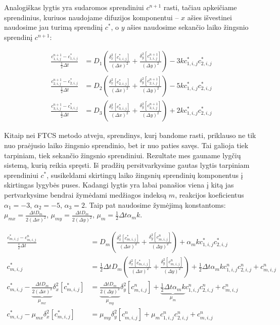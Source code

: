 Analogiškas lygtis yra sudaromos sprendiniui $c^{n+1}$ rasti, tačiau apkeičiame sprendinius, kuriuos naudojame difuzijos komponentui -- $x$ ašies išvestinei naudosime jau turimą sprendinį $c^{*}$, o $y$ ašies naudosime sekančio laiko žingsnio sprendinį $c^{n+1}$:

\begin{subequations} \label{eqs:adi-next-step}
\begin{align}
	\frac{c^{n+1}_{1,i,j} - c^*_{1,i,j}}{\frac{1}{2}\Delta t} 
	&= D_1 \left( \frac{\delta_x^2[c^{*}_{1,i,j}]}{(\Delta x)^2} 
	+ \frac{\delta_y^2[c^{n+1}_{1,i,j}]}{(\Delta y)^2} \right) - 3kc^*_{1,i,j}c^*_{2,i,j}\\
	\frac{c^{n+1}_{2,i,j} - c^*_{2,i,j}}{\frac{1}{2}\Delta t} 
	&= D_2 \left( \frac{\delta_x^2[c^*_{2,i,j}]}{(\Delta x)^2}
	+ \frac{\delta_y^2[c^{n+1}_{2,i,j}]}{(\Delta y)^2} \right) - 5kc^*_{1,i,j}c^*_{2,i,j}\\
	\frac{c^{n+1}_{3,i,j} - c^*_{3,i,j}}{\frac{1}{2}\Delta t} 
	&= D_3 \left( \frac{\delta_x^2[c^*_{3,i,j}]}{(\Delta x)^2} 
	+ \frac{\delta_y^2[c^{n+1}_{3,i,j}]}{(\Delta y)^2} \right) +2kc^*_{1,i,j}c^*_{2,i,j}
\end{align}
\end{subequations}

\newpage

Kitaip nei FTCS metodo atveju, sprendinys, kurį bandome rasti, priklauso ne tik nuo praėjusio laiko žingsnio sprendinio, bet ir nuo paties savęs. Tai galioja tiek tarpiniam, tiek sekančio žingsnio sprendiniui. Rezultate mes gauname lygčių sistemą, kurią reikia spręsti. Iš pradžių persitvarkysime gautas lygtis tarpiniam sprendiniui $c^*$, susikeldami skirtingų laiko žingsnių sprendinių komponentus į skirtingas lygybės puses. Kadangi lygtis yra labai panašios viena į kitą jas pertvarkysime bendrai žymėdami medžiagos indeksą $m$, reakcijos koeficientus $\alpha_1 = -3$, $\alpha_2 = -5$, $\alpha_3 = 2$. Taip pat naudosime žymėjimą konstantoms: $\mu_{mx} = \frac{\Delta t D_m}{2(\Delta x)^2}$, $\mu_{my} = \frac{\Delta t D_m}{2(\Delta y)^2}$, $\mu_m = \frac{1}{2} \Delta t \alpha_m k$.

\begin{align*}
  \frac{c^{*}_{m,i,j} - c^n_{m,i,j}}{\frac{1}{2}\Delta t} 
  &= D_m \left( \frac{\delta_x^2[c^{*}_{m,i,j}]}{(\Delta x)^2} 
  + \frac{\delta_y^2[c^n_{m,i,j}]}{(\Delta y)^2} \right) 
  + \alpha_mkc^*_{1,i,j}c^*_{2,i,j} \\
  c^*_{m,i,j} 
  &= \frac{1}{2}\Delta t D_m \left( \frac{\delta_x^2[c^{*}_{m,i,j}]}{(\Delta x)^2} 
  + \frac{\delta_y^2[c^n_{m,i,j}]}{(\Delta y)^2} \right)
  + \frac{1}{2}\Delta t \alpha_m kc^n_{1,i,j}c^n_{2,i,j} + c^n_{m,i,j}\\
  c^*_{m,i,j} - \underbrace{\frac{\Delta t D_m}{2(\Delta x)^2}}_{\mu_{mx}}\delta_x^2[c^{*}_{m,i,j}] 
  &= \underbrace{\frac{\Delta t D_m}{2(\Delta y)^2}}_{\mu_{my}}\delta_y^2[c^n_{m,i,j}]
  + \underbrace{\frac{1}{2}\Delta t \alpha_m k}_{\mu_m}c^n_{1,i,j}c^n_{2,i,j} + c^n_{m,i,j}\\
  c^*_{m,i,j} - \mu_{mx}\delta_x^2[c^{*}_{m,i,j}]
  &= \mu_{my}\delta_y^2[c^n_{m,i,j}] + \mu_m c^n_{1,i,j}c^n_{2,i,j} + c^n_{m,i,j}
\end{align*}

